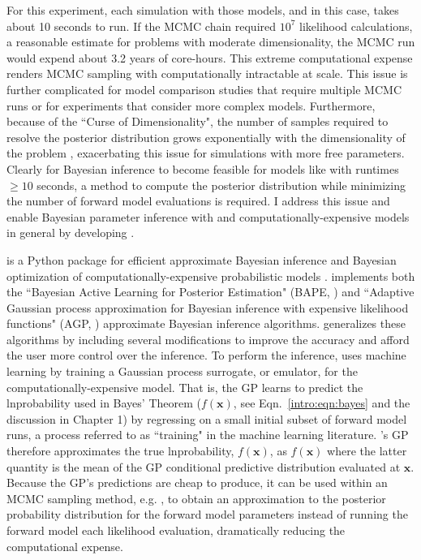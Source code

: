 For this experiment, each \vplanet simulation with those models, \stellar and \atmesc in this case, takes about 10 seconds to run. If the MCMC chain required  $10^7$ likelihood calculations, a reasonable estimate for problems with moderate dimensionality, the MCMC run would expend about 3.2 years of core-hours. This extreme computational expense renders MCMC sampling with \vplanet computationally intractable at scale. This issue is further complicated for model comparison studies that require multiple MCMC runs or for experiments that consider more complex models. Furthermore, because of the ``Curse of Dimensionality", the number of samples required to resolve the posterior distribution grows exponentially with the dimensionality of the problem \citep{Bellman1957}, exacerbating this issue for simulations with more free parameters. Clearly for Bayesian inference to become feasible for models like \vplanet with runtimes $\geq 10$ seconds, a method to compute the posterior distribution while minimizing the number of forward model evaluations is required. I address this issue and enable Bayesian parameter inference with \vplanet and computationally-expensive models in general by developing \approxposterior \citep{FlemingVanderPlas2018}.

\approxposterior is a Python package for efficient approximate Bayesian inference and Bayesian optimization of computationally-expensive probabilistic models \citep{FlemingVanderPlas2018}. \approxposterior implements both the ``Bayesian Active Learning for Posterior Estimation" (BAPE, \citet{Kandasamy2017}) and ``Adaptive Gaussian process approximation for Bayesian inference with expensive likelihood functions" (AGP, \citet{Wang2018}) approximate Bayesian inference algorithms. \approxposterior generalizes these algorithms by including several modifications to improve the accuracy and afford the user more control over the inference. To perform the inference, \approxposterior uses machine learning by training a Gaussian process \citep[GP,][]{Rasmussen2006} surrogate, or emulator, for the computationally-expensive model. That is, the GP learns to predict the lnprobability used in Bayes' Theorem ($f(\textbf{x})$, see Eqn.~\ref{intro:eqn:bayes} and the discussion in Chapter 1) by regressing on a small initial subset of forward model runs, a process referred to as ``training" in the machine learning literature. \approxposterior's GP therefore approximates the true lnprobability, $f(\textbf{x})$, as $\hat{f}(\textbf{x})$ where the latter quantity is the mean of the GP conditional predictive distribution evaluated at $\textbf{x}$. Because the GP's predictions are cheap to produce, it can be used within an MCMC sampling method, e.g. \emcee \citep{ForemanMackey2013}, to obtain an approximation to the posterior probability distribution for the forward model parameters instead of running the forward model each likelihood evaluation, dramatically reducing the computational expense. 

